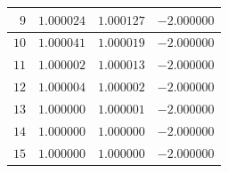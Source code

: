 \begin{example}
\begin{itemize}
\begin{center}
\begin{tabular}{|r|r|r|r|}
	$9$ & $1.000024$ & $1.000127$ & $-2.000000$ \\ \hline 
	$10$ & $1.000041$ & $1.000019$ & $-2.000000$ \\ \hline 
	$11$ & $1.000002$ & $1.000013$ & $-2.000000$ \\ \hline 
	$12$ & $1.000004$ & $1.000002$ & $-2.000000$ \\ \hline 
	$13$ & $1.000000$ & $1.000001$ & $-2.000000$ \\ \hline 
	$14$ & $1.000000$ & $1.000000$ & $-2.000000$ \\ \hline 
	$15$ & $1.000000$ & $1.000000$ & $-2.000000$ \\ \hline 
	\end{tabular}
	\end{center}
\end{itemize}
\end{example}

